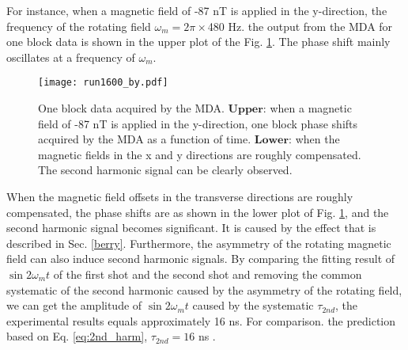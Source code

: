 \documentclass[prx,twocolumn,10pt,nofootinbib]{revtex4-1}
\begin{document}
For instance, when a magnetic field of -87 nT is applied in the y-direction, the frequency of the rotating field $\omega_m= 2 \pi \times$480 Hz. the output from the MDA for one block data is shown in the upper plot of the Fig. \ref{fig:trans_signal}. The phase shift mainly oscillates at a frequency of $\omega_m$.
\begin{figure}[H]
\centering
	\texttt{[image: run1600\_by.pdf]}
	\caption{One block data acquired by the MDA. $\textbf{Upper:}$ when a magnetic field of -87 nT is applied in the y-direction, one block phase shifts acquired by the MDA as a function of time. $\textbf{Lower:}$  when the magnetic fields in the x and y directions are roughly compensated. The second harmonic signal can be clearly observed.}
	\label{fig:trans_signal}
\end{figure}
When the magnetic field offsets in the transverse directions are roughly compensated, the phase shifts are as shown in the lower plot of Fig. \ref{fig:trans_signal}, and the second harmonic signal becomes significant. It is caused by the effect that is described in Sec. \ref{berry}. Furthermore, the asymmetry of the rotating magnetic field can also induce second harmonic signals. By comparing the fitting result of $\sin 2 \omega_m t$ of the first shot and the second shot and removing the common systematic of the second harmonic caused by the asymmetry of the rotating field, we can get the amplitude of $\sin 2 \omega_m t$ caused by the systematic $\tau_{2nd}$, the experimental results equals approximately 16 ns. For comparison. the prediction based on Eq. \ref{eq:2nd_harm}, $\tau_{2nd}=16$ ns .
\end{document}
